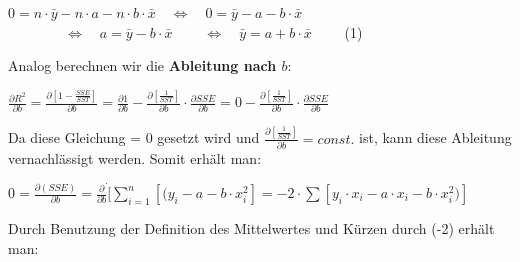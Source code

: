 \documentclass[12pt]{article}
\begin{document}
\begin{center}
$ 0 = n \cdot \bar{y} - n \cdot a -n \cdot b \cdot \bar{x} \quad \Leftrightarrow \quad 0 = \bar{y} - a  -b \cdot \bar{x}$ \\[0.2cm] 
$ \qquad \qquad \Leftrightarrow \quad a = \bar{y} -b \cdot \bar{x} \qquad\ \Leftrightarrow \quad \bar{y} = a +  b \cdot \bar{x} \qquad $ (1)
\end{center}

Analog berechnen wir die \textbf{Ableitung nach $b$}:
 
\begin{center}
\begin{large} 
$ \frac{\partial R^2}{\partial b} = \frac{\partial [ 1 - \frac {SSE}{SST}]}{\partial b} =  \frac{\partial 1}{\partial b} - \frac{\partial [\frac{1}{SST}]}{\partial b} \cdot \frac{\partial SSE}{\partial b} = 0 -  \frac{\partial [\frac{1}{SST}]}{\partial b} \cdot \frac{\partial SSE}{\partial b} $ 
\end{large}
\end{center}
% 
Da diese Gleichung = 0 gesetzt wird und $ \frac{\partial [\frac{1}{SST}]}{\partial b} = const. $ ist, kann diese Ableitung vernachlässigt werden. Somit erhält man: 

\begin{center}
\begin{large} 
$ 0 = \frac{\partial (SSE)}{\partial b } = \frac{\partial}{\partial b} \dot  [\sum\limits_{i=1}^n [(y_i - a -b \cdot x_i^2] = -2 \cdot \sum[y_i \cdot x_i - a \cdot x_i - b \cdot x_i^2)] $
\end{large}
\end{center}
%
Durch Benutzung der Definition des Mittelwertes und Kürzen durch (-2) erhält man:  
 
\end{document}
